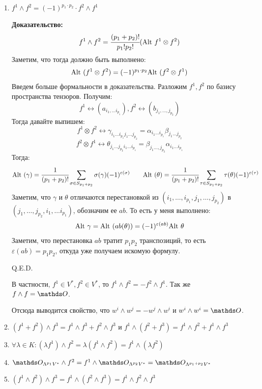 \begin{enumerate}
    \item $f^1\wedge f^2 = (-1)^{p_1 \cdot p_2} \cdot  f^2 \wedge f^1$
    
    \textbf{Доказательство:}
    $$f^1 \wedge f^2 = \cfrac{(p_1 + p_2)!}{p_1!p_2!} (\text{Alt } f^1 \otimes f^2)$$
    Заметим, что тогда должно быть выполнено:
    $$\text{Alt } (f^1 \otimes f^2)  = (-1)^{p_1\cdot p_2} \text{Alt }(f^2\otimes f^1)$$
    Введем больше формальности в доказательства. Разложим $f^1,f^2$ по базису пространства тензоров. Получим:
    $$f^1 \leftrightarrow (a_{i_1,\ldots i_{p_1}}), f^2 \leftrightarrow (b_{j_1,\ldots, j_{p_2} }) $$
    Тогда давайте выпишем:
    $$f^1 \otimes f^2 \leftrightarrow \gamma_{i_1\ldots i_{p_1}j_1\ldots j_{p_2}} = \alpha_{i_1\ldots i_{p_1} } \beta_{j_1\ldots j_{p_2}}$$
    $$f^2\otimes f^1 \leftrightarrow \theta_{j_1\ldots j_{p_2} i_1\ldots i_{p_1}}  = \beta_{j_1\ldots, j_{p_2}}\alpha_{i_1\ldots i_{p_1}}$$
    Тогда:
    $$\text{Alt } (\gamma) = \cfrac{1}{(p_1 + p_2)!} \sum\limits_{\sigma \in S_{p_1+p_2}} \sigma(\gamma)(-1)^{\varepsilon(\sigma)} \quad\quad \text{Alt }(\theta) = \cfrac{1}{(p_1+p_2)!} \sum_{\tau \in S_{p_1+p_2}}\tau(\theta)(-1)^{\varepsilon(\tau)}$$
     Заметим, что $\gamma$ и $\theta$ отличаются перестановкой из $(i_1,\ldots,i_{p_1},j_1,\ldots, j_{p_2})$ в $(j_1,\ldots, j_{p_2},i_{1},\ldots i_{p_1})$, обозначим ее $ab$. То есть у меня выполнено:
    $$\text{Alt } \gamma = \text{Alt }(ab(\theta))=(-1)^{\varepsilon(ab)}\text{Alt } \theta$$
    Заметим, что перестановка $ab$ тратит $p_1p_2$ транспозиций, то есть $\varepsilon(ab) = p_1 p_2$, откуда уже получаем искомую формулу.

    \hfill Q.E.D.

    В частности, $f^1\in V^*,f^2\in V^*$, то $f^1 \wedge f^2 = -f^2 \wedge f^1$. Так же $f \wedge f = \zero$. 

    Отсюда выводится свойство, что $w^i \wedge w^j = - w^j \wedge w^i$ и $w^i \wedge w^i = \zero$. 

    \item $(f^1+f^2)\wedge f^3 = f^1\wedge f^3 + f^2 \wedge f^3$ и $f^1 \wedge (f^2 + f^3) = f^1 \wedge f^2 + f^1 \wedge f^3$
    \item $\forall \lambda \in K: (\lambda f^1)\wedge f^2 = \lambda(f^1 \wedge f^2) = f^1 \wedge (\lambda f^2)$
    \item $\zero_{\Lambda^{p_1}V^*} \wedge f^2 = f^1 \wedge \zero_{\Lambda^{p_2}V^*}=\zero_{\Lambda^{p_1+p_2}V^*}$
    \item $(f^1 \wedge f^2 ) \wedge f^3 = f^1 \wedge (f^2 \wedge f^3) = f^1 \wedge f^2 \wedge f^3$


\end{enumerate}
